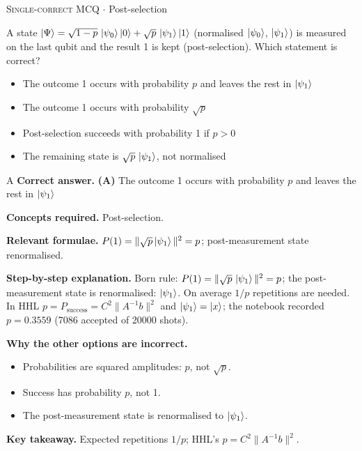 \documentclass[11pt,a4paper]{article}
\newcommand{\optlabel}[1]{\textbf{(#1)}}
\newcommand{\correctlabel}[1]{\textcolor{okgreen}{\textbf{(#1)}\,\ding{51}}}
\newenvironment{qitem}[1]{\begin{list}{}{\setlength{\leftmargin}{3.3em}\setlength{\labelwidth}{3.1em}%
  \setlength{\labelsep}{0.2em}\setlength{\topsep}{3pt}\setlength{\parsep}{3pt}}\item[\textbf{Q.#1}\hfill]}{\end{list}}
\newcommand{\qsep}{\par\vspace{2pt}{\color{black!15}\hrule}\vspace{4pt}}
\newcommand{\qmeta}[2]{{\footnotesize\color{black!60}\textsc{#1} \;$\cdot$\; #2}\par}
\begin{document}
\begin{qitem}{31}
\qmeta{Single-correct MCQ}{Post-selection}
A state $\ket\Psi = \sqrt{1 - p}\,\ket{\psi_0}\ket0 + \sqrt p\,\ket{\psi_1}\ket1$ (normalised $\ket{\psi_0}$, $\ket{\psi_1}$) is measured on the last qubit and the result 1 is kept (post-selection).
Which statement is correct?
\begin{itemize}[leftmargin=2.6em, labelsep=0.4em, itemsep=2pt, topsep=3pt]
\item[\correctlabel{A}] The outcome 1 occurs with probability $p$ and leaves the rest in $\ket{\psi_1}$
\item[\optlabel{B}] The outcome 1 occurs with probability $\sqrt p$
\item[\optlabel{C}] Post-selection succeeds with probability 1 if $p > 0$
\item[\optlabel{D}] The remaining state is $\sqrt p\,\ket{\psi_1}$, not normalised
\end{itemize}
\end{qitem}
\begin{solbox}{A}
\textbf{\color{brand}Correct answer.} \textcolor{okgreen}{\textbf{(A)}} The outcome 1 occurs with probability $p$ and leaves the rest in $\ket{\psi_1}$

\textbf{\color{brand}Concepts required.} Post-selection.

\textbf{\color{brand}Relevant formulae.} $P(1) = \|\sqrt p\ket{\psi_1}\|^2 = p$; post-measurement state renormalised.

\textbf{\color{brand}Step-by-step explanation.} Born rule: $P(1) = \|\sqrt p\,\ket{\psi_1}\|^2 = p$; the post-measurement state is renormalised: $\ket{\psi_1}$. On average $1/p$ repetitions are needed. In HHL $p = P_{\text{success}} = C^2\|A^{-1}b\|^2$
and $\ket{\psi_1} = \ket x$; the notebook recorded $p = 0.3559$ (7086 accepted of 20000 shots).

\textbf{\color{brand}Why the other options are incorrect.}
\begin{itemize}[leftmargin=2.4em, itemsep=1pt, topsep=2pt]
\item[\textbf{(B)}] Probabilities are squared amplitudes: $p$, not $\sqrt p$.
\item[\textbf{(C)}] Success has probability $p$, not 1.
\item[\textbf{(D)}] The post-measurement state is renormalised to $\ket{\psi_1}$.
\end{itemize}
\textbf{\color{brand}Key takeaway.} Expected repetitions $1/p$; HHL's $p = C^2\|A^{-1}b\|^2$.
\end{solbox}
\qsep
\end{document}
